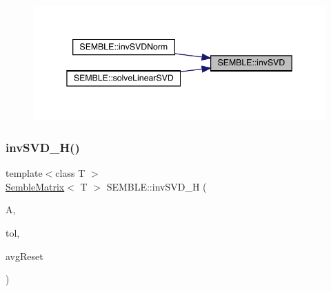 \begin{figure}[H]
\begin{center}
\leavevmode
\includegraphics[width=345pt]{d7/dfd/namespaceSEMBLE_adf8aee09f619bd4b2d88858a50ed5eee_icgraph}
\end{center}
\end{figure}
\mbox{\label{namespaceSEMBLE_a752dade1ba0b0662d55c17cfdc66cddc}} 
\subsubsection{\texorpdfstring{invSVD\_H()}{invSVD\_H()}}
{\footnotesize\ttfamily template$<$class T $>$ \\
\mbox{\hyperlink{structSEMBLE_1_1SembleMatrix}{Semble\+Matrix}}$<$ T $>$ S\+E\+M\+B\+L\+E\+::inv\+S\+V\+D\+\_\+H (\begin{DoxyParamCaption}\item[{const \mbox{\hyperlink{structSEMBLE_1_1SembleMatrix}{Semble\+Matrix}}$<$ T $>$ \&}]{A,  }\item[{const double}]{tol,  }\item[{double \&}]{avg\+Reset }\end{DoxyParamCaption})}

